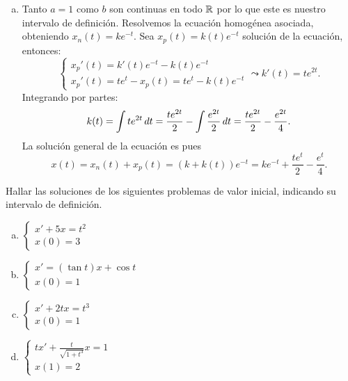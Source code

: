 \documentclass[../ecuaciones_diferenciales.tex]{subfiles}
\begin{document}
\begin{solution}
\begin{enumerate}[a), wide, labelwidth=0pt, labelindent=0pt]
		\item Tanto \(a = 1\) como \(b\) son continuas en todo \(\mathbb{R}\) por lo que
		      este es nuestro intervalo de definición. Resolvemos la ecuación
		      homogénea asociada, obteniendo \(x_n(t) = k e^{-t}\). Sea
		      \(x_p(t) = k(t) e^{-t}\) solución de la ecuación, entonces:
		      \[\begin{cases}
				      x_p'(t) = k'(t) e^{-t} - k(t) e^{-t} \\
				      x_p'(t) = t e^t - x_p(t) = t e^t - k(t) e^{-t}
			      \end{cases}
			      \leadsto
			      k'(t) = t e^{2t}.
		      \]
		      Integrando por partes:
		      \[k(t) = \int t e^{2t} \mathop{d\!} t
			      = \frac{t e^{2t}}{2} - \int \frac{e^{2t}}{2} \mathop{d\!} t
			      = \frac{t e^{2t}}{2} - \frac{e^{2t}}{4}.\]
		      La solución general de la ecuación es pues
		      \[x(t) = x_n(t) + x_p(t) = (k + k(t))e^{-t}
			      = k e^{-t} + \frac{t e^{t}}{2} - \frac{e^{t}}{4}.\]
	\end{enumerate}
\end{solution}

\begin{problem}
Hallar las soluciones de los siguientes problemas de valor inicial,
indicando su intervalo de definición.
\begin{multicols}{2}
	\begin{enumerate}[a)]
		\item \(\displaystyle
		      \begin{cases}
			      x' + 5x = t^2 \\
			      x(0) = 3
		      \end{cases}\)

		\item \(\displaystyle
		      \begin{cases}
			      x' = (\tan t)x + \cos t \\
			      x(0) = 1
		      \end{cases}\)

		\item \(\displaystyle
		      \begin{cases}
			      x' + 2tx = t^3 \\
			      x(0) = 1
		      \end{cases}\)

		\item \(\displaystyle
		      \begin{cases}
			      tx' + \frac{t}{\sqrt{1 + t^3}}x = 1 \\
			      x(1) = 2
		      \end{cases}\)
	\end{enumerate}
\end{multicols}
\end{problem}
\end{document}

